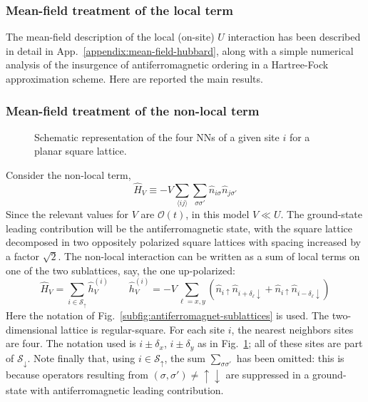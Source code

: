\subsubsection{Mean-field treatment of the local term}

The mean-field description of the local (on-site) $U$ interaction has been described in detail in App.~\ref{appendix:mean-field-hubbard}, along with a simple numerical analysis of the insurgence of antiferromagnetic ordering in a Hartree-Fock approximation scheme. Here are reported the main results. \todo

\subsubsection{Mean-field treatment of the non-local term}

\begin{figure}
	\centering
	
	\caption{Schematic representation of the four NNs of a given site $i$ for a planar square lattice.}
	\label{fig:square-nearest-neighbors}
\end{figure}

Consider the non-local term,
\begin{equation}\label{eq:extended-hubbard-nonlocal-interaction}
	\hat H_V \equiv - V \sum_{\langle ij \rangle} \sum_{\sigma \sigma'} \hat n_{i\sigma} \hat n_{j\sigma'}
\end{equation}
{\color{tabred}Since the relevant values for $V$ are $\mathcal{O}(t)$, in this model $V \ll U$.} The ground-state leading contribution will be the antiferromagnetic state, with the square lattice decomposed in two oppositely polarized square lattices with spacing increased by a factor $\sqrt{2}$. The non-local interaction can be written as a sum of local terms on one of the two sublattices, say, the one up-polarized:
\[
	\hat H_V = \sum_{i \in \mathcal{S}_\uparrow} \hat h_V^{(i)}
	\qquad
	\hat h_V^{(i)} = -V \sum_{\ell = x,y} \left(
		\hat n_{i\uparrow} \hat n_{i + \delta_\ell \downarrow} + \hat n_{i\uparrow} \hat n_{i - \delta_\ell \downarrow} 
	\right) 
\]
Here the notation of Fig.~\ref{subfig:antiferromagnet-sublattices} is used. The two-dimensional lattice is regular-square. For each site $i$, the nearest neighbors sites are four. The notation used is $i \pm \delta_x$, $i \pm  \delta_y$ as in Fig.~\ref{fig:square-nearest-neighbors}; all of these sites are part of $\mathcal{S}_\downarrow$. Note finally that, using $i \in \mathcal{S}_\uparrow$, the sum $\sum_{\sigma \sigma'}$ has been omitted: this is because operators resulting from $(\sigma, \sigma') \neq \uparrow\downarrow$ are suppressed in a ground-state with antiferromagnetic leading contribution.

